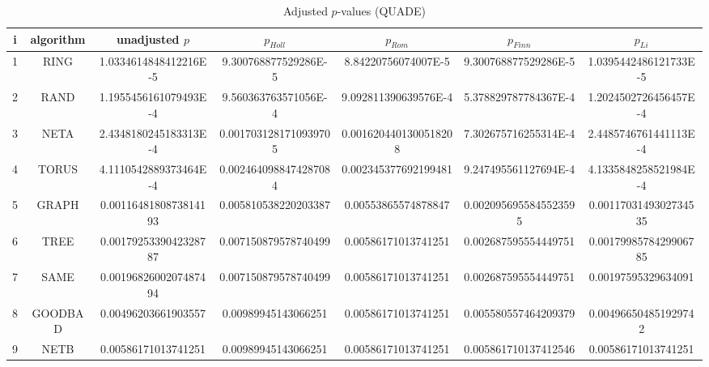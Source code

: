 \documentclass[a4paper,10pt]{article}
\begin{document}
\begin{landscape}
\begin{table}[!htp]
\centering\scriptsize
\caption{Adjusted $p$-values (QUADE)}
\begin{tabular}{ccccccc}
i&algorithm&unadjusted $p$&$p_{Holl}$&$p_{Rom}$&$p_{Finn}$&$p_{Li}$\\
\hline
1& RING&1.0334614848412216E-5&9.300768877529286E-5&8.84220756074007E-5&9.300768877529286E-5&1.0395442486121733E-5\\
2& RAND&1.1955456161079493E-4&9.560363763571056E-4&9.092811390639576E-4&5.378829787784367E-4&1.2024502726456457E-4\\
3& NETA&2.4348180245183313E-4&0.0017031281710939705&0.0016204401300518208&7.302675716255314E-4&2.4485746761441113E-4\\
4& TORUS&4.1110542889373464E-4&0.0024640988474287084&0.002345377692199481&9.247495561127694E-4&4.1335848258521984E-4\\
5& GRAPH&0.0011648180873814193&0.005810538220203387&0.00553865574878847&0.0020956955845523595&0.0011703149302734535\\
6& TREE&0.0017925339042328787&0.007150879578740499&0.00586171013741251&0.002687595554449751&0.0017998578429906785\\
7& SAME&0.0019682600207487494&0.007150879578740499&0.00586171013741251&0.002687595554449751&0.00197595329634091\\
8& GOODBAD&0.00496203661903557&0.00989945143066251&0.00586171013741251&0.005580557464209379&0.004966504851929742\\
9& NETB&0.00586171013741251&0.00989945143066251&0.00586171013741251&0.005861710137412546&0.00586171013741251\\
\hline
\end{tabular}
\end{table}

\end{landscape}
\end{document}
